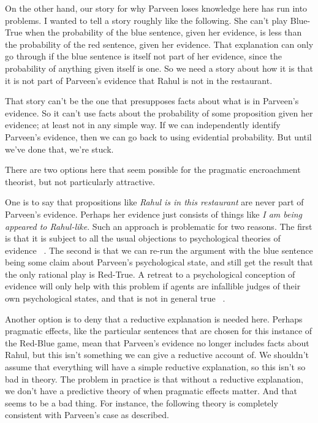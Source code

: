 On the other hand, our story for why Parveen loses knowledge here has run into problems. I wanted to tell a story roughly like the following. She can't play Blue-True when the probability of the blue sentence, given her evidence, is less than the probability of the red sentence, given her evidence. That explanation can only go through if the blue sentence is itself not part of her evidence, since the probability of anything given itself is one. So we need a story about how it is that it is not part of Parveen's evidence that Rahul is not in the restaurant.

That story can't be the one that presupposes facts about what is in Parveen's evidence. So it can't use facts about the probability of some proposition given her evidence; at least not in any simple way. If we can independently identify Parveen's evidence, then we can go back to using evidential probability. But until we've done that, we're stuck.

There are two options here that seem possible for the pragmatic encroachment theorist, but not particularly attractive. 

One is to say that propositions like \emph{Rahul is in this restaurant} are never part of Parveen's evidence. Perhaps her evidence just consists of things like \emph{I am being appeared to Rahul-like}. Such an approach is problematic for two reasons. The first is that it is subject to all the usual objections to psychological theories of evidence ~\citep{Williamson2007-WILTPO-17}. The second is that we can re-run the argument with the blue sentence being some claim about Parveen's psychological state, and still get the result that the only rational play is Red-True. A retreat to a psychological conception of evidence will only help with this problem if agents are infallible judges of their own psychological states, and that is not in general true ~\citep{Schwitzgebel2008}. 

Another option is to deny that a reductive explanation is needed here. Perhaps pragmatic effects, like the particular sentences that are chosen for this instance of the Red-Blue game, mean that Parveen's evidence no longer includes facts about Rahul, but this isn't something we can give a reductive account of. We shouldn't assume that everything will have a simple reductive explanation, so this isn't so bad in theory. The problem in practice is that without a reductive explanation, we don't have a predictive theory of when pragmatic effects matter. And that seems to be a bad thing. For instance, the following theory is completely consistent with Parveen's case as described.

